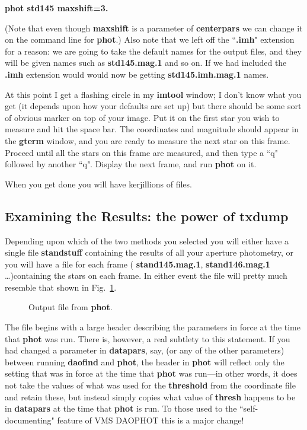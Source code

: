 \centerline{ {\bf phot std145 maxshift=3.}  }
 
\noindent
(Note that even though {\bf maxshift} is a parameter of {\bf centerpars}
we can change it on the command line for {\bf phot}.) Also note that we
left off the ``{\bf .imh}" extension for a reason: we are going to take
the default names for the output files, and they will be given names
such as {\bf std145.mag.1} and so on. If we had included the {\bf .imh}
extension would would now be getting {\bf std145.imh.mag.1} names.
 
At this point I get a flashing circle in my {\bf imtool} window; I don't
know what you get (it depends upon how your defaults are set up) but
there should be some sort of obvious marker on top of your image.
Put it on the first star you wish to measure and hit the space bar.  The
coordinates and magnitude should appear in the {\bf gterm} window, and
you are ready to measure the next star on this frame.  Proceed until all
the stars on this frame are measured, and then type a ``q" followed by
another ``q".  Display the next frame, and run {\bf phot} on it.
 
When you get done you will have  kerjillions of files.  
 
\subsection{Examining the Results: the power of {\bf txdump }}
 
Depending upon which of the two methods you selected you will either
have a single file {\bf standstuff} containing the results of all your
aperture photometry, or you will have a file for each frame ({\bf
stand145.mag.1}, {\bf stand146.mag.1} \ldots)containing the stars
on each frame.  In either event the file will pretty much resemble that
shown in Fig.~\ref{photphotout}.
\begin{figure}
\vspace{7.5in}
\caption{\label{photphotout} Output file from {\bf phot}.}
\end{figure}
The file begins with a large header describing the parameters in
force at the time that {\bf phot} was run.  There is, however, a real
subtlety to this statement.  If you had changed a parameter in {\bf
datapars}, say, (or any of the other parameters) between running {\bf
daofind} and {\bf phot}, the header in {\bf phot} will reflect only the
setting that was in force at the time that {\bf phot} was run---in other
words, it does not take the values of what was used for the {\bf
threshold} from the coordinate file and retain these, but instead simply
copies what value of {\bf thresh} happens to be in {\bf datapars} at the
time that {\bf phot} is run.  To those used to the
``self-documenting" feature of VMS DAOPHOT this is a major change!
 
